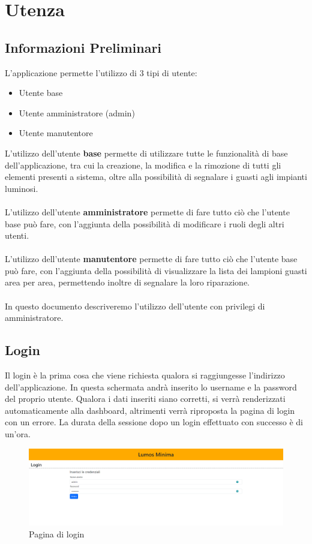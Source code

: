 \documentclass[a4paper, 12pt]{article}
\begin{document}
\newpage
\section{Utenza}
\subsection{Informazioni Preliminari}
L'applicazione permette l'utilizzo di 3 tipi di utente:
\begin{itemize}
    \item Utente base
    \item Utente amministratore (admin)
    \item Utente manutentore
\end{itemize}
L'utilizzo dell'utente \textbf{base} permette di utilizzare tutte le funzionalità di base dell'applicazione, tra cui la creazione, la modifica e la rimozione di tutti gli elementi presenti a sistema, oltre alla possibilità di segnalare i guasti agli impianti luminosi.\\ \\
L'utilizzo dell'utente \textbf{amministratore} permette di fare tutto ciò che l'utente base può fare, con l'aggiunta della possibilità di modificare i ruoli degli altri utenti.\\ \\
L'utilizzo dell'utente \textbf{manutentore} permette di fare tutto ciò che l'utente base può fare, con l'aggiunta della possibilità di visualizzare la lista dei lampioni guasti area per area, permettendo inoltre di segnalare la loro riparazione.\\\\
In questo documento descriveremo l'utilizzo dell'utente con privilegi di amministratore.

\subsection{Login}
Il login è la prima cosa che viene richiesta qualora si raggiungesse l'indirizzo dell'applicazione. In questa schermata andrà inserito lo username e la password del proprio utente. Qualora i dati inseriti siano corretti, si verrà renderizzati automaticamente alla dashboard, altrimenti verrà riproposta la pagina di login con un errore. La durata della sessione dopo un login effettuato con successo è di un'ora.
\begin{figure}[H]
\centering
\includegraphics[width=\textwidth]{login}
\caption{Pagina di login}
\end{figure}
\end{document}

